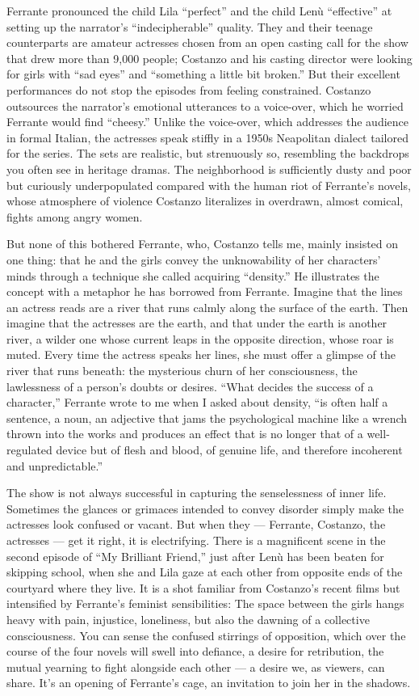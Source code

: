 Ferrante pronounced the child Lila ``perfect'' and the child Lenù
``effective'' at setting up the narrator's ``indecipherable'' quality.
They and their teenage counterparts are amateur actresses chosen from an
open casting call for the show that drew more than 9,000 people;
Costanzo and his casting director were looking for girls with ``sad
eyes'' and ``something a little bit broken.'' But their excellent
performances do not stop the episodes from feeling constrained. Costanzo
outsources the narrator's emotional utterances to a voice-over, which he
worried Ferrante would find ``cheesy.'' Unlike the voice-over, which
addresses the audience in formal Italian, the actresses speak stiffly in
a 1950s Neapolitan dialect tailored for the series. The sets are
realistic, but strenuously so, resembling the backdrops you often see in
heritage dramas. The neighborhood is sufficiently dusty and poor but
curiously underpopulated compared with the human riot of Ferrante's
novels, whose atmosphere of violence Costanzo literalizes in overdrawn,
almost comical, fights among angry women.

But none of this bothered Ferrante, who, Costanzo tells me, mainly
insisted on one thing: that he and the girls convey the unknowability of
her characters' minds through a technique she called acquiring
``density.'' He illustrates the concept with a metaphor he has borrowed
from Ferrante. Imagine that the lines an actress reads are a river that
runs calmly along the surface of the earth. Then imagine that the
actresses are the earth, and that under the earth is another river, a
wilder one whose current leaps in the opposite direction, whose roar is
muted. Every time the actress speaks her lines, she must offer a glimpse
of the river that runs beneath: the mysterious churn of her
consciousness, the lawlessness of a person's doubts or desires. ``What
decides the success of a character,'' Ferrante wrote to me when I asked
about density, ``is often half a sentence, a noun, an adjective that
jams the psychological machine like a wrench thrown into the works and
produces an effect that is no longer that of a well-regulated device but
of flesh and blood, of genuine life, and therefore incoherent and
unpredictable.''

The show is not always successful in capturing the senselessness of
inner life. Sometimes the glances or grimaces intended to convey
disorder simply make the actresses look confused or vacant. But when
they --- Ferrante, Costanzo, the actresses --- get it right, it is
electrifying. There is a magnificent scene in the second episode of ``My
Brilliant Friend,'' just after Lenù has been beaten for skipping school,
when she and Lila gaze at each other from opposite ends of the courtyard
where they live. It is a shot familiar from Costanzo's recent films but
intensified by Ferrante's feminist sensibilities: The space between the
girls hangs heavy with pain, injustice, loneliness, but also the dawning
of a collective consciousness. You can sense the confused stirrings of
opposition, which over the course of the four novels will swell into
defiance, a desire for retribution, the mutual yearning to fight
alongside each other --- a desire we, as viewers, can share. It's an
opening of Ferrante's cage, an invitation to join her in the shadows.


